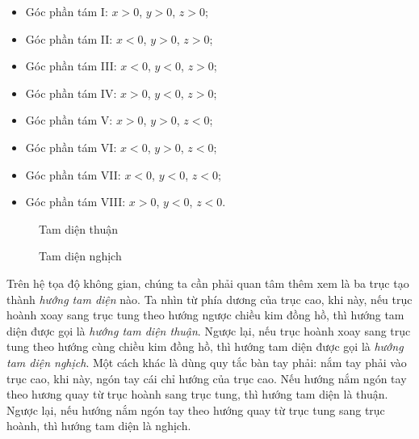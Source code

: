 \documentclass[a4paper, titlepage, openany]{book}
\begin{document}
\begin{itemize}
   \item Góc phần tám I: $x>0$, $y>0$, $z>0$;
   \item Góc phần tám II: $x<0$, $y>0$, $z>0$;
   \item Góc phần tám III: $x<0$, $y<0$, $z>0$;
   \item Góc phần tám IV: $x>0$, $y<0$, $z>0$;
   \item Góc phần tám V: $x>0$, $y>0$, $z<0$;
   \item Góc phần tám VI: $x<0$, $y>0$, $z<0$;
   \item Góc phần tám VII: $x<0$, $y<0$, $z<0$;
   \item Góc phần tám VIII: $x>0$, $y<0$, $z<0$.
\end{itemize}

\begin{figure}[h]
   \centering
   \begin{minipage}[b]{0.48\textwidth}
      \centering
      \caption{Tam diện thuận}
      \label{fig:tam dien thuan}
   \end{minipage}
   \hfill
   \begin{minipage}[b]{0.48\textwidth}
      \centering
      \caption{Tam diện nghịch}
      \label{fig:tam dien nghich}
   \end{minipage}
\end{figure}

Trên hệ tọa độ không gian, chúng ta cần phải quan tâm thêm xem là ba trục tạo thành \emph{hướng tam diện} nào. Ta nhìn từ phía dương của trục cao, khi này, nếu trục hoành xoay sang trục tung theo hướng ngược chiều kim đồng hồ, thì hướng tam diện được gọi là \emph{hướng tam diện thuận}. Ngược lại, nếu trục hoành xoay sang trục tung theo hướng cùng chiều kim đồng hồ, thì hướng tam diện được gọi là \emph{hướng tam diện nghịch}. Một cách khác là dùng quy tắc bàn tay phải: nắm tay phải vào trục cao, khi này, ngón tay cái chỉ hướng của trục cao. Nếu hướng nắm ngón tay theo hương quay từ trục hoành sang trục tung, thì hướng tam diện là thuận. Ngược lại, nếu hướng nắm ngón tay theo hướng quay từ trục tung sang trục hoành, thì hướng tam diện là nghịch.
\end{document}
